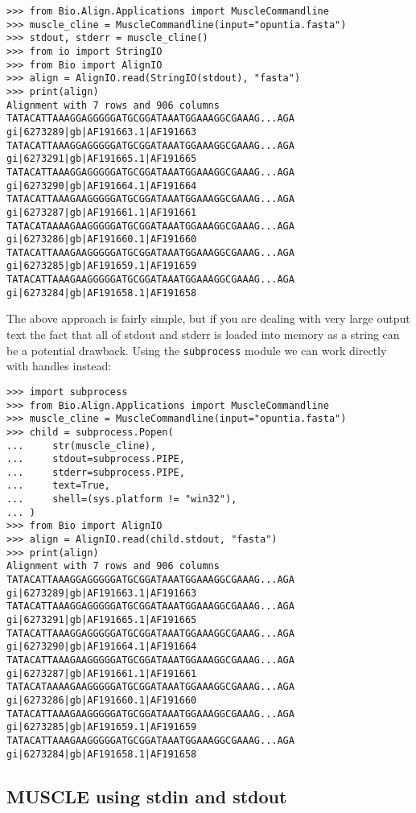 \begin{verbatim}
>>> from Bio.Align.Applications import MuscleCommandline
>>> muscle_cline = MuscleCommandline(input="opuntia.fasta")
>>> stdout, stderr = muscle_cline()
>>> from io import StringIO
>>> from Bio import AlignIO
>>> align = AlignIO.read(StringIO(stdout), "fasta")
>>> print(align)
Alignment with 7 rows and 906 columns
TATACATTAAAGGAGGGGGATGCGGATAAATGGAAAGGCGAAAG...AGA gi|6273289|gb|AF191663.1|AF191663
TATACATTAAAGGAGGGGGATGCGGATAAATGGAAAGGCGAAAG...AGA gi|6273291|gb|AF191665.1|AF191665
TATACATTAAAGGAGGGGGATGCGGATAAATGGAAAGGCGAAAG...AGA gi|6273290|gb|AF191664.1|AF191664
TATACATTAAAGAAGGGGGATGCGGATAAATGGAAAGGCGAAAG...AGA gi|6273287|gb|AF191661.1|AF191661
TATACATAAAAGAAGGGGGATGCGGATAAATGGAAAGGCGAAAG...AGA gi|6273286|gb|AF191660.1|AF191660
TATACATTAAAGAAGGGGGATGCGGATAAATGGAAAGGCGAAAG...AGA gi|6273285|gb|AF191659.1|AF191659
TATACATTAAAGAAGGGGGATGCGGATAAATGGAAAGGCGAAAG...AGA gi|6273284|gb|AF191658.1|AF191658
\end{verbatim}

The above approach is fairly simple, but if you are dealing with very large output
text the fact that all of stdout and stderr is loaded into memory as a string can
be a potential drawback. Using the \verb|subprocess| module we can work directly
with handles instead:

\begin{verbatim}
>>> import subprocess
>>> from Bio.Align.Applications import MuscleCommandline
>>> muscle_cline = MuscleCommandline(input="opuntia.fasta")
>>> child = subprocess.Popen(
...     str(muscle_cline),
...     stdout=subprocess.PIPE,
...     stderr=subprocess.PIPE,
...     text=True,
...     shell=(sys.platform != "win32"),
... )
>>> from Bio import AlignIO
>>> align = AlignIO.read(child.stdout, "fasta")
>>> print(align)
Alignment with 7 rows and 906 columns
TATACATTAAAGGAGGGGGATGCGGATAAATGGAAAGGCGAAAG...AGA gi|6273289|gb|AF191663.1|AF191663
TATACATTAAAGGAGGGGGATGCGGATAAATGGAAAGGCGAAAG...AGA gi|6273291|gb|AF191665.1|AF191665
TATACATTAAAGGAGGGGGATGCGGATAAATGGAAAGGCGAAAG...AGA gi|6273290|gb|AF191664.1|AF191664
TATACATTAAAGAAGGGGGATGCGGATAAATGGAAAGGCGAAAG...AGA gi|6273287|gb|AF191661.1|AF191661
TATACATAAAAGAAGGGGGATGCGGATAAATGGAAAGGCGAAAG...AGA gi|6273286|gb|AF191660.1|AF191660
TATACATTAAAGAAGGGGGATGCGGATAAATGGAAAGGCGAAAG...AGA gi|6273285|gb|AF191659.1|AF191659
TATACATTAAAGAAGGGGGATGCGGATAAATGGAAAGGCGAAAG...AGA gi|6273284|gb|AF191658.1|AF191658
\end{verbatim}

\subsection{MUSCLE using stdin and stdout}

